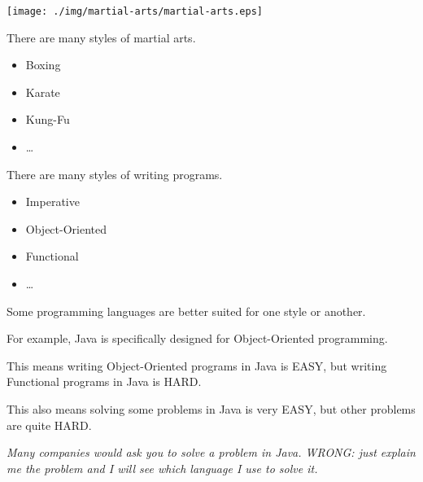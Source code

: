 \documentclass[a4paper, 9pt]{extarticle}
\begin{document}
\begin{center}
\texttt{[image: ./img/martial-arts/martial-arts.eps]}
\end{center}

\begin{multicols}{2}
\setlength{\columnseprule}{0.4pt}

There are many styles of martial arts.

\begin{itemize}

  \item Boxing

  \item Karate

  \item Kung-Fu

  \item \ldots

\end{itemize}

\columnbreak

There are many styles of writing programs.

\begin{itemize}

  \item Imperative

  \item Object-Oriented

  \item Functional

  \item \ldots

\end{itemize}

\end{multicols}

Some programming languages are better suited for one style or another.

For example, Java is specifically designed for Object-Oriented programming.

This means writing Object-Oriented programs in Java is EASY,
but writing Functional programs in Java is HARD.

This also means solving some problems in Java is very EASY,
but other problems are quite HARD.

\textsl{Many companies would ask you to solve a problem in Java. WRONG: just
explain me the problem and I will see which language I use to solve it.}
\end{document}
